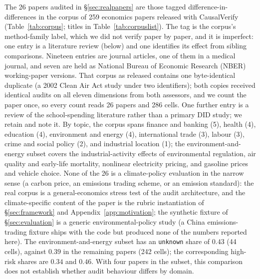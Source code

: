 The 26 papers audited in \S\ref{sec:realpapers} are those tagged
difference-in-differences in the corpus of 259 economics papers released with
CausalVerify~\cite{causalverify} (Table~\ref{tab:corpus}; titles in
Table~\ref{tab:corpuslist}). The tag is the corpus's method-family label, which
we did not verify paper by paper, and it is imperfect: one entry is a literature
review (below) and one identifies its effect from sibling comparisons. Nineteen entries are journal articles, one of them in a
medical journal, and seven are held as National Bureau of Economic Research
(NBER) working-paper versions. That corpus as released contains one
byte-identical duplicate (a 2002 Clean Air Act study under two identifiers);
both copies received identical
audits on all eleven dimensions from both assessors, and we count the paper
once, so every count reads 26 papers and 286 cells. One further entry is a
review of the school-spending literature rather than a primary DID study; we
retain and note it. By topic, the corpus spans finance and banking (5), health
(4), education (4), environment and energy (4), international trade (3), labour
(3), crime and social policy (2), and industrial location (1); the
environment-and-energy subset covers the industrial-activity effects of
environmental regulation, air quality and early-life mortality, nonlinear
electricity pricing, and gasoline prices and vehicle choice. None of the 26 is
a climate-policy evaluation in the narrow sense (a carbon price, an emissions
trading scheme, or an emission standard): the real corpus is a
general-economics stress test of the audit architecture, and the
climate-specific content of the paper is the rubric instantiation of
\S\ref{sec:framework} and Appendix~\ref{app:motivation}; the synthetic fixture
of \S\ref{sec:evaluation} is a generic environmental-policy study (a China
emissions-trading fixture ships with the code but produced none of the numbers
reported here). The environment-and-energy subset has an \texttt{unknown}
share of $0.43$ (44 cells), against $0.39$ in the remaining papers (242
cells); the corresponding high-risk shares are $0.34$ and $0.46$. With four
papers in the subset, this comparison does not establish whether audit
behaviour differs by domain.

